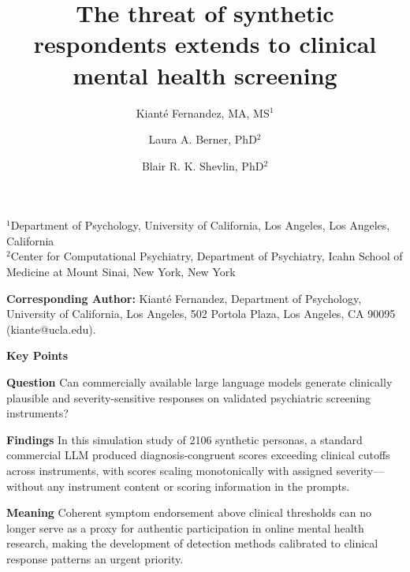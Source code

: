 \documentclass[12pt]{article}
\title{The threat of synthetic respondents extends to clinical mental health screening}
\author{%
  Kiant\'{e} Fernandez, MA, MS$^{1}$ \and Laura A. Berner, PhD$^{2}$ \and Blair R. K. Shevlin, PhD$^{2}$
}
\date{}
\begin{document}
\maketitle

\begin{flushleft}

$^{1}$Department of Psychology, University of California, Los Angeles, Los Angeles, California \\
$^{2}$Center for Computational Psychiatry, Department of Psychiatry, Icahn School of Medicine at Mount Sinai, New York, New York \\

\vspace{1em}

\textbf{Corresponding Author:} Kiant\'{e} Fernandez, Department of Psychology, University of California, Los Angeles, 502 Portola Plaza, Los Angeles, CA 90095 (kiante@ucla.edu).

\end{flushleft}

\newpage

\begin{flushleft}
\textbf{Key Points}

\vspace{0.5em}

\textbf{Question\hspace{1em}} Can commercially available large language models generate clinically plausible and severity-sensitive responses on validated psychiatric screening instruments?

\vspace{0.5em}

\textbf{Findings\hspace{1em}} In this simulation study of 2106 synthetic personas, a standard commercial LLM produced diagnosis-congruent scores exceeding clinical cutoffs across instruments, with scores scaling monotonically with assigned severity---without any instrument content or scoring information in the prompts.

\vspace{0.5em}

\textbf{Meaning\hspace{1em}} Coherent symptom endorsement above clinical thresholds can no longer serve as a proxy for authentic participation in online mental health research, making the development of detection methods calibrated to clinical response patterns an urgent priority.
\end{flushleft}
\end{document}
